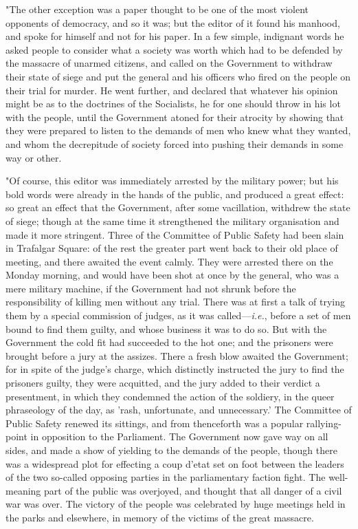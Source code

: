 "The other exception was a paper thought to be one of the most violent
opponents of democracy, and so it was; but the editor of it found his
manhood, and spoke for himself and not for his paper. In a few simple,
indignant words he asked people to consider what a society was worth
which had to be defended by the massacre of unarmed citizens, and called
on the Government to withdraw their state of siege and put the general
and his officers who fired on the people on their trial for murder. He
went further, and declared that whatever his opinion might be as to the
doctrines of the Socialists, he for one should throw in his lot with the
people, until the Government atoned for their atrocity by showing that
they were prepared to listen to the demands of men who knew what they
wanted, and whom the decrepitude of society forced into pushing their
demands in some way or other.

"Of course, this editor was immediately arrested by the military power;
but his bold words were already in the hands of the public, and produced
a great effect: so great an effect that the Government, after some
vacillation, withdrew the state of siege; though at the same time it
strengthened the military organisation and made it more stringent. Three
of the Committee of Public Safety had been slain in Trafalgar Square: of
the rest the greater part went back to their old place of meeting, and
there awaited the event calmly. They were arrested there on the Monday
morning, and would have been shot at once by the general, who was a mere
military machine, if the Government had not shrunk before the
responsibility of killing men without any trial. There was at first a
talk of trying them by a special commission of judges, as it was
called---\emph{i.e.}, before a set of men bound to find them guilty, and
whose business it was to do so. But with the Government the cold fit had
succeeded to the hot one; and the prisoners were brought before a jury
at the assizes. There a fresh blow awaited the Government; for in spite
of the judge's charge, which distinctly instructed the jury to find the
prisoners guilty, they were acquitted, and the jury added to their
verdict a presentment, in which they condemned the action of the
soldiery, in the queer phraseology of the day, as 'rash, unfortunate,
and unnecessary.' The Committee of Public Safety renewed its sittings,
and from thenceforth was a popular rallying-point in opposition to the
Parliament. The Government now gave way on all sides, and made a show of
yielding to the demands of the people, though there was a widespread
plot for effecting a coup d'etat set on foot between the leaders of the
two so-called opposing parties in the parliamentary faction fight. The
well-meaning part of the public was overjoyed, and thought that all
danger of a civil war was over. The victory of the people was celebrated
by huge meetings held in the parks and elsewhere, in memory of the
victims of the great massacre.

